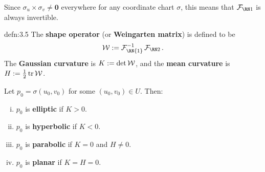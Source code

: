 Since $\sigma_u \times \sigma_v \neq \mathbf 0$ everywhere for any 
coordinate chart $\sigma$, this means that $\FFF$ is always invertible. 

\begin{defn}{defn:3.5}
    The {\bf shape operator} (or {\bf Weingarten matrix}) is defined to be 
    \[ {\cal W} := {\cal F}_{\text{\RN{1}}}^{-1} \SFF. \] 
    The {\bf Gaussian curvature} is $K := \det {\cal W}$, and the {\bf mean curvature} 
    is $H := \frac12 \operatorname{tr} {\cal W}$. 

    Let $p_0 = \sigma(u_0, v_0)$ for some $(u_0, v_0) \in U$. Then: 
    \begin{enumerate}[(i)]
        \item $p_0$ is {\bf elliptic} if $K > 0$. 
        \item $p_0$ is {\bf hyperbolic} if $K < 0$. 
        \item $p_0$ is {\bf parabolic} if $K = 0$ and $H \neq 0$.
        \item $p_0$ is {\bf planar} if $K = H = 0$. 
    \end{enumerate}
\end{defn}\vspace{-0.25cm}

